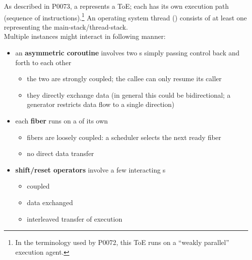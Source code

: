 \label{appendixb}
As described in P0073\cite{P0073}, a \ectx represents a ToE; each \ectx has
its own execution path (sequence of instructions).\footnote{In the terminology
used by P0072\cite{P0072}, this ToE runs on a ``weakly parallel'' execution
agent.} An operating system thread
() consists of at least one \ectx representing the
main-stack/thread-stack.\\
Multiple \ectx instances might interact in following manner:
\begin{itemize}
\item an {\bfseries asymmetric coroutine} involves two \ectx s simply passing
      control back and forth to each other
    \begin{itemize}
        \item the two are strongly coupled; the callee \ectx can only resume
            its caller
        \item they directly exchange data (in general this could be
            bidirectional; a generator restricts data flow to a single
            direction)
    \end{itemize}
\item each {\bfseries fiber} runs on a \ectx of its own
    \begin{itemize}
        \item fibers are loosely coupled: a scheduler selects the next ready fiber
        \item no direct data transfer
    \end{itemize}
\item {\bfseries shift/reset operators} involve a few interacting \ectx s
    \begin{itemize}
        \item coupled
        \item data exchanged
        \item interleaved transfer of execution
    \end{itemize}
\end{itemize}
